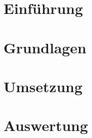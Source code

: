 \documentclass[fontsize=11pt,
		 oneside,
		 ngerman,
		 titlepage,
		 paper=a4,
		 bibliography=totoc,
		 listof=totoc,
		 DIV=10,
		 BCOR=5mm,
		 headsepline,
		 footsepline,
		 ]{scrartcl}
\begin{document}

\cleardoublepage







\tableofcontents
\clearpage

\section{Einführung}
\label{sec:Einführung}



\clearpage

\section{Grundlagen}
\label{sec:Grundlagen}

\clearpage

\clearpage

\clearpage

\clearpage

\section{Umsetzung}
\label{sec:Umsetzung}

\clearpage

\clearpage

\clearpage

\clearpage

\section{Auswertung}
\label{sec:Auswertung}

\clearpage




\listoffigures
\clearpage
\lstlistoflistings
\clearpage
%

\renewcommand{\refname}{Quellenverzeichnis}








\mbox{}
\end{document}
